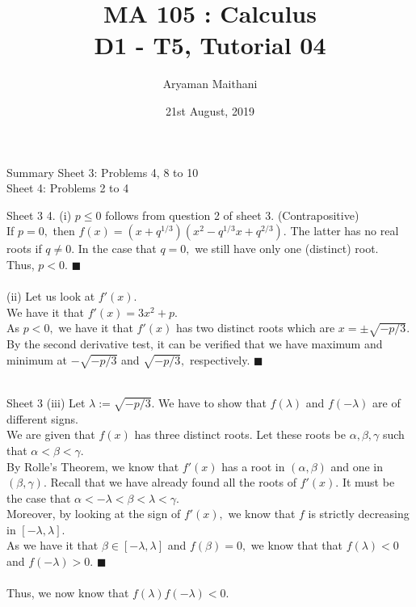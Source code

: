 \documentclass[handout, aspectratio=169]{beamer}
\title{MA 105 : Calculus\\ D1 - T5, Tutorial 04}  %
\author{Aryaman Maithani}
\date[21-08-2019]{21st August, 2019}               %
\institute[IITB]{IIT Bombay}
\begin{document}
\begin{frame}
	\titlepage
\end{frame}
\begin{frame}{Summary} 
	Sheet 3: Problems 4, 8 to 10\\	
	Sheet 4: Problems 2 to 4
\end{frame}
\begin{frame}{Sheet 3}                            %
	4. (i) $p \le 0$ follows from question 2 of sheet 3. (Contrapositive)\\
	If $p = 0,$ then $f(x) = (x + q^{1/3})(x^2 - q^{1/3}x + q^{2/3}).$ The latter has no real roots if $q \neq 0.$ In the case that $q = 0,$ we still have only one (distinct) root.\\
	Thus, $p < 0.$ \hfill $\blacksquare$ \\~\\
	(ii) Let us look at $f'(x).$ \\
	We have it that $f'(x) = 3x^2 + p.$\\
	As $p < 0,$ we have it that $f'(x)$ has two distinct roots which are $x = \pm \sqrt{-p/3}.$\\
	By the second derivative test, it can be verified that we have maximum and minimum at $-\sqrt{-p/3}$ and $\sqrt{-p/3},$ respectively. \hfill $\blacksquare$ \\~\\
\end{frame}
\begin{frame}{Sheet 3}
	(iii) Let $\lambda := \sqrt{-p/3}.$ We have to show that $f(\lambda)$ and $f(-\lambda)$ are of different signs.\\
	We are given that $f(x)$ has three distinct roots. Let these roots be $\alpha, \beta, \gamma$ such that $\alpha < \beta < \gamma.$\\
	By Rolle's Theorem, we know that $f'(x)$ has a root in $(\alpha, \beta)$ and one in $(\beta, \gamma).$ Recall that we have already found all the roots of $f'(x).$ It must be the case that $\alpha < -\lambda < \beta < \lambda < \gamma.$\\
	Moreover, by looking at the sign of $f'(x),$ we know that $f$ is strictly decreasing in $[-\lambda, \lambda].$\\
	As we have it that $\beta \in [-\lambda, \lambda]$ and $f(\beta) = 0,$ we know that that $f(\lambda) < 0$ and $f(-\lambda) > 0.$ \hfill $\blacksquare$\\~\\
	Thus, we now know that $f(\lambda)f(-\lambda) < 0.$
\end{frame}
\end{document}
